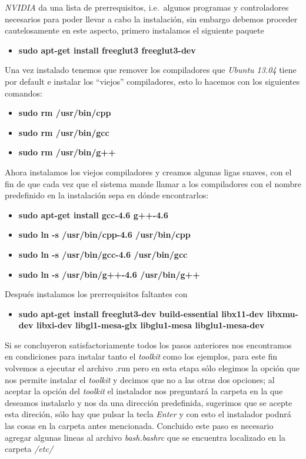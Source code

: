 \documentclass{article}
\begin{document}
\emph{NVIDIA} da una lista de prerrequisitos, i.e.~algunos programas y
controladores necesarios para poder llevar a cabo la instalación, sin
embargo debemos proceder cautelosamente en este aspecto, primero
instalamos el siguiente paquete

\begin{itemize}
\itemsep1pt\parskip0pt
\item
  \textbf{sudo apt-get install freeglut3 freeglut3-dev}
\end{itemize}

Una vez instalado tenemos que remover los compiladores que \emph{Ubuntu
13.04} tiene por default e instalar los ``viejos'' compiladores, esto lo
hacemos con los siguientes comandos:

\begin{itemize}
\itemsep1pt\parskip0pt
\item
  \textbf{sudo rm /usr/bin/cpp}
\item
  \textbf{sudo rm /usr/bin/gcc}
\item
  \textbf{sudo rm /usr/bin/g++}
\end{itemize}

Ahora instalamos los viejos compiladores y creamos algunas ligas suaves,
con el fin de que cada vez que el sistema mande llamar a los
compiladores con el nombre predefinido en la instalación sepa en dónde
encontrarlos:

\begin{itemize}
\itemsep1pt\parskip0pt
\item
  \textbf{sudo apt-get install gcc-4.6 g++-4.6}
\item
  \textbf{sudo ln -s /usr/bin/cpp-4.6 /usr/bin/cpp}
\item
  \textbf{sudo ln -s /usr/bin/gcc-4.6 /usr/bin/gcc}
\item
  \textbf{sudo ln -s /usr/bin/g++-4.6 /usr/bin/g++}
\end{itemize}

Después instalamos los prerrequisitos faltantes con

\begin{itemize}
\itemsep1pt\parskip0pt
\item
  \textbf{sudo apt-get install freeglut3-dev build-essential libx11-dev
  libxmu-dev libxi-dev libgl1-mesa-glx libglu1-mesa libglu1-mesa-dev}
\end{itemize}

Si se concluyeron satisfactoriamente todos los pasos anteriores nos
encontramos en condiciones para instalar tanto el \emph{toolkit} como
los ejemplos, para este fin volvemos a ejecutar el archivo .run pero en
esta etapa sólo elegimos la opción que nos permite instalar el
\emph{toolkit} y decimos que no a las otras dos opciones; al aceptar la
opción del \emph{toolkit} el instalador nos preguntará la carpeta en la
que deseamos instalarlo y nos da una dirección predefinida, sugerimos
que se acepte esta direción, sólo hay que pulsar la tecla \emph{Enter} y
con esto el instalador podnrá las cosas en la carpeta antes mencionada.
Concluido este paso es necesario agregar algunas lineas al archivo
\emph{bash.bashrc} que se encuentra localizado en la carpeta
\emph{/etc/}
\end{document}
